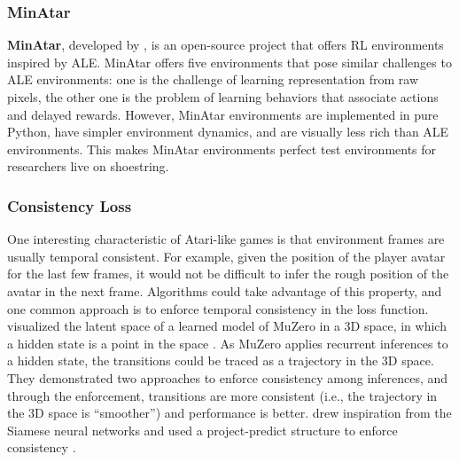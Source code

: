 \subsubsection{MinAtar}
\textbf{MinAtar}, developed by \citeauthor{MinAtarAtariInspiredTestbed_Young.Tian_2019}, is an open-source project that offers RL environments inspired by ALE.
MinAtar offers five environments that pose similar challenges to ALE environments: one is the challenge of learning representation from raw pixels, the other one is the problem of learning behaviors that associate actions and delayed rewards.
However, MinAtar environments are implemented in pure Python, have simpler environment dynamics, and are visually less rich than ALE environments.
This makes MinAtar environments perfect test environments for researchers live on shoestring.

\subsubsection{Consistency Loss}
One interesting characteristic of Atari-like games is that environment frames are usually temporal consistent.
For example, given the position of the player avatar for the last few frames, it would not be difficult to infer the rough position of the avatar in the next frame.
Algorithms could take advantage of this property, and one common approach is to enforce temporal consistency in the loss function.
\citeauthor{VisualizingMuZeroModels_deVries.Voskuil.ea_2021} visualized the latent space of a learned model of MuZero in a 3D space, in which a hidden state is a point in the space \cite{VisualizingMuZeroModels_deVries.Voskuil.ea_2021}.
As MuZero applies recurrent inferences to a hidden state, the transitions could be traced as a trajectory in the 3D space.
They demonstrated two approaches to enforce consistency among inferences, and through the enforcement, transitions are more consistent (i.e., the trajectory in the 3D space is ``smoother'') and performance is better.
\citeauthor{MasteringAtariGames_Ye.Liu.ea_2021} drew inspiration from the Siamese neural networks and used a project-predict structure to enforce consistency \cite{MasteringAtariGames_Ye.Liu.ea_2021,SiameseNeuralNetworks_Koch.Zemel.ea_}.

